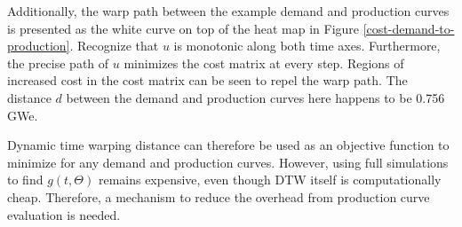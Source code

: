 Additionally, the warp path between the example demand and production 
curves is presented as the white curve on top of the heat map in 
Figure \ref{cost-demand-to-production}. 
Recognize that $u$ is monotonic along both time axes. Furthermore, the precise
path of $u$ minimizes the cost matrix at every step. Regions of increased 
cost in the cost matrix can be seen to repel the warp path. The 
distance $d$ between the demand and production curves here happens 
to be 0.756 GWe.

Dynamic time warping distance can therefore be used as an objective function 
to minimize for any demand and production curves. However, using full 
simulations to find $g(t, \Theta)$ remains expensive, even though DTW itself 
is computationally cheap. Therefore, a mechanism to reduce the overhead 
from production curve evaluation is needed.
